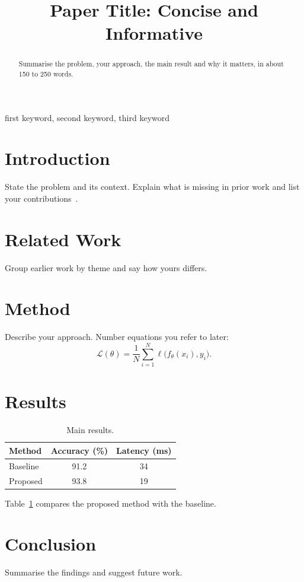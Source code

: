 \documentclass[conference]{IEEEtran}
\begin{document}
\title{Paper Title: Concise and Informative}

\author{
  \and
}

\maketitle

\begin{abstract}
Summarise the problem, your approach, the main result and why it matters,
in about 150 to 250 words.
\end{abstract}

\begin{IEEEkeywords}
first keyword, second keyword, third keyword
\end{IEEEkeywords}

\section{Introduction}
State the problem and its context. Explain what is missing in prior work and
list your contributions~\cite{example2024}.

\section{Related Work}
Group earlier work by theme and say how yours differs.

\section{Method}
Describe your approach. Number equations you refer to later:
\begin{equation}
  \mathcal{L}(\theta) = \frac{1}{N}\sum_{i=1}^{N} \ell\bigl(f_\theta(x_i), y_i\bigr).
  \label{eq:loss}
\end{equation}

\section{Results}
\begin{table}[t]
  \centering
  \caption{Main results.}
  \label{tab:results}
  \begin{tabular}{lcc}
    \toprule
    Method & Accuracy (\%) & Latency (ms) \\
    \midrule
    Baseline & 91.2 & 34 \\
    Proposed & 93.8 & 19 \\
    \bottomrule
  \end{tabular}
\end{table}
Table~\ref{tab:results} compares the proposed method with the baseline.

\section{Conclusion}
Summarise the findings and suggest future work.



\end{document}
